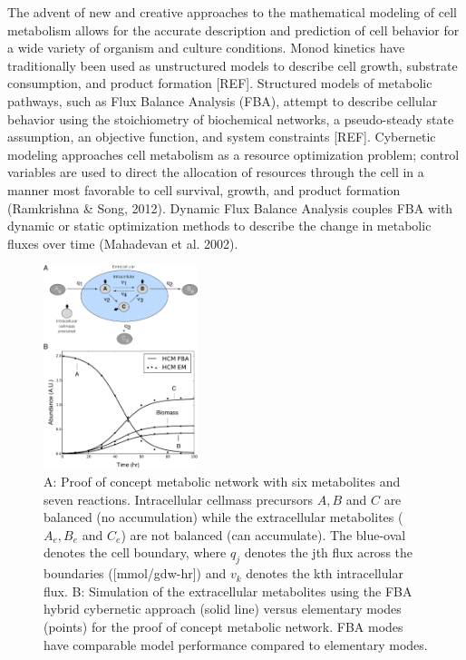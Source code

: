 \documentclass[10pt,twocolumn,twoside,final]{IEEEtran}
\begin{document}
The advent of new and creative approaches to the mathematical modeling of cell metabolism allows for the accurate description and prediction of cell behavior for a wide variety of organism and culture conditions.  Monod kinetics have traditionally been used as unstructured models to describe cell growth, substrate consumption, and product formation [REF].  Structured models of metabolic pathways, such as Flux Balance Analysis (FBA), attempt to describe cellular behavior using the stoichiometry of biochemical networks, a pseudo-steady state assumption, an objective function, and system constraints [REF].  Cybernetic modeling approaches cell metabolism as a resource optimization problem; control variables are used to direct the allocation of resources through the cell in a manner most favorable to cell survival, growth, and product formation (Ramkrishna \& Song, 2012). Dynamic Flux Balance Analysis couples FBA with dynamic or static optimization methods to describe the change in metabolic fluxes over time (Mahadevan et al. 2002).


\begin{figure}[!t]\centering
\includegraphics[width=0.40\textwidth]{./figs/Fig-1-GeneralModel-Results.pdf}
\caption{A: Proof of concept metabolic network with six metabolites and seven reactions.
Intracellular cellmass precursors $A,B$ and $C$ are balanced (no accumulation) while the extracellular metabolites ($A_{e},B_{e}$ and $C_{e}$) are not balanced (can accumulate). The blue-oval denotes the cell boundary, where $q_{j}$ denotes the jth flux across the boundaries ([mmol/gdw-hr]) and $v_{k}$ denotes the kth intracellular flux. B: Simulation of the extracellular metabolites using the FBA hybrid cybernetic approach (solid line) versus elementary modes (points) for the proof of concept metabolic network. FBA modes have comparable model performance compared to elementary modes.
}\label{fig:model-fitting}
\end{figure}
\end{document}
